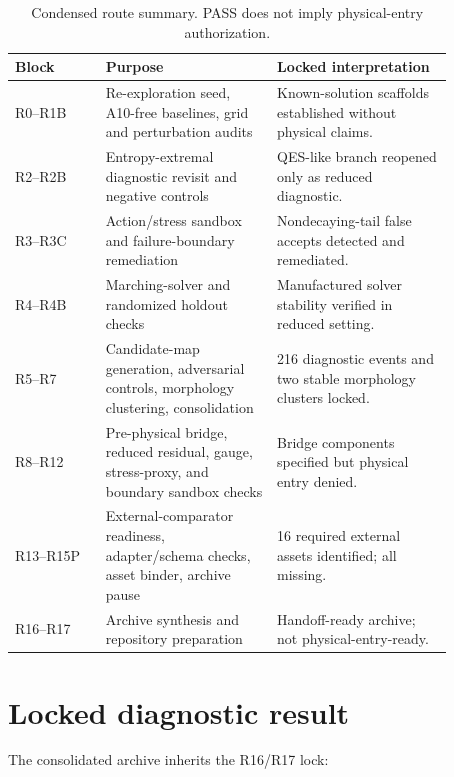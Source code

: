 \documentclass[11pt,a4paper]{article}
\begin{document}
\begin{table}[htbp]
\centering
\small
\caption{Condensed route summary. PASS does not imply physical-entry authorization.}
\label{tab:route}
\begin{tabular}{p{0.18\linewidth}p{0.34\linewidth}p{0.35\linewidth}}
\toprule
Block & Purpose & Locked interpretation \\
\midrule
R0--R1B & Re-exploration seed, A10-free baselines, grid and perturbation audits & Known-solution scaffolds established without physical claims. \\
R2--R2B & Entropy-extremal diagnostic revisit and negative controls & QES-like branch reopened only as reduced diagnostic. \\
R3--R3C & Action/stress sandbox and failure-boundary remediation & Nondecaying-tail false accepts detected and remediated. \\
R4--R4B & Marching-solver and randomized holdout checks & Manufactured solver stability verified in reduced setting. \\
R5--R7 & Candidate-map generation, adversarial controls, morphology clustering, consolidation & 216 diagnostic events and two stable morphology clusters locked. \\
R8--R12 & Pre-physical bridge, reduced residual, gauge, stress-proxy, and boundary sandbox checks & Bridge components specified but physical entry denied. \\
R13--R15P & External-comparator readiness, adapter/schema checks, asset binder, archive pause & 16 required external assets identified; all missing. \\
R16--R17 & Archive synthesis and repository preparation & Handoff-ready archive; not physical-entry-ready. \\
\bottomrule
\end{tabular}
\end{table}

\section{Locked diagnostic result}

The consolidated archive inherits the R16/R17 lock:
\end{document}
